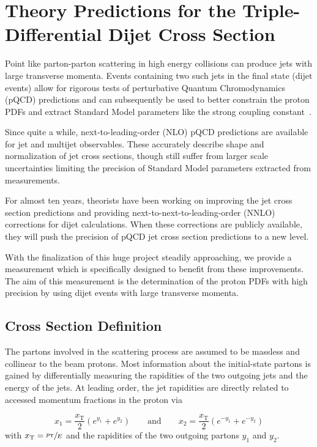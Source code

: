 
\chapter{Theory Predictions for the Triple-Differential Dijet Cross Section}

Point like parton-parton scattering in high energy collisions can produce
jets with large transverse momenta. Events containing two such jets  in the
final state (dijet events) allow for rigorous tests of perturbative Quantum
Chromodynamics (pQCD) predictions and can subsequently be used to better
constrain the proton PDFs and extract Standard Model parameters like the strong
coupling constant~\as.

Since quite a while, next-to-leading-order (NLO) pQCD predictions are available
for jet and multijet observables. These accurately describe shape and
normalization of jet cross sections, though still suffer from larger scale
uncertainties limiting the precision of Standard Model parameters extracted from
measurements.

For almost ten years, theorists have been working on improving the jet cross
section predictions and providing next-to-next-to-leading-order (NNLO) corrections for
dijet calculations. When these corrections are publicly available, they will
push the precision of pQCD jet cross section predictions to a new level.

With the finalization of this huge project steadily approaching, we provide a
measurement which is specifically designed to benefit from these improvements.
The aim of this measurement is the determination of the proton PDFs with high
precision by using dijet events with large transverse momenta.

\section{Cross Section Definition}

The partons involved in the scattering process are assumed to be massless and
collinear to the beam protons. Most information about the initial-state partons
is gained by differentially measuring the rapidities of the two outgoing jets
and the energy of the jets. At leading order, the jet rapidities are directly
related to accessed momentum fractions in the proton via

\begin{equation*}
    x_1 = \frac{x_\mathrm{T}}{2} \left( e^{y_1} + e^{y_2} \right)
    \qquad\text{and}\qquad x_2 = \frac{x_\mathrm{T}}{2} \left( e^{-y_1} +
    e^{-y_2} \right)
\end{equation*}
with $x_{\mathrm{T}} = \sfrac{p_{\mathrm{T}}}{E}$ and the rapidities of the two outgoing
partons $y_1$ and $y_2$.

